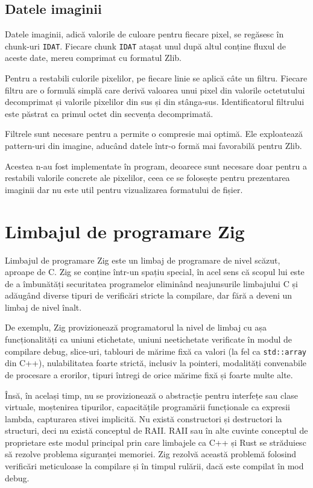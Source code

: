 \documentclass[a4paper,12pt]{report}
\begin{document}
\subsection{Datele imaginii}

Datele imaginii, adică valorile de culoare pentru fiecare pixel, se regăsesc în chunk-uri \texttt{IDAT}.
Fiecare chunk \texttt{IDAT} atașat unul după altul conține fluxul de aceste date, mereu comprimat cu formatul Zlib.

Pentru a restabili culorile pixelilor, pe fiecare linie se aplică câte un filtru.
Fiecare filtru are o formulă simplă care derivă valoarea unui pixel
din valorile octetutului decomprimat și valorile pixelilor din sus și din stânga-sus.
Identificatorul filtrului este păstrat ca primul octet din secvența decomprimată. 

Filtrele sunt necesare pentru a permite o compresie mai optimă.
Ele exploatează pattern-uri din imagine, aducând datele într-o formă mai favorabilă pentru Zlib.

Acestea n-au fost implementate în program, deoarece sunt necesare
doar pentru a restabili valorile concrete ale pixelilor,
ceea ce se folosește pentru prezentarea imaginii dar nu este util pentru vizualizarea formatului de fișier.


\section{Limbajul de programare Zig}

Limbajul de programare Zig este un limbaj de programare de nivel scăzut, aproape de C.
Zig se conține într-un spațiu special, în acel sens că scopul lui este de
a îmbunătăți securitatea programelor eliminând neajunsurile limbajului C
și adăugând diverse tipuri de verificări stricte la compilare,
dar fără a deveni un limbaj de nivel înalt.

De exemplu, Zig provizionează programatorul la nivel de limbaj cu așa funcționalități ca 
uniuni etichetate, uniuni neetichetate verificate în modul de compilare debug,
slice-uri, tablouri de mărime fixă ca valori (la fel ca \texttt{std::array} din C++),
nulabilitatea foarte strictă, inclusiv la pointeri, modalități convenabile de procesare a erorilor,
tipuri întregi de orice mărime fixă și foarte multe alte.

Însă, în același timp, nu se provizionează o abstracție pentru interfețe sau clase virtuale,
moștenirea tipurilor, capacitățile programării funcționale ca expresii lambda,
capturarea stivei implicită.
Nu există constructori și destructori la structuri, deci nu există conceptul de \ac{RAII}.
\ac{RAII} sau în alte cuvinte conceptul de proprietare este modul principal
prin care limbajele ca C++ și Rust se străduiesc să rezolve problema siguranței memoriei.
Zig rezolvă această problemă folosind verificări meticuloase la compilare și în timpul rulării,
dacă este compilat în mod debug.
\end{document}
